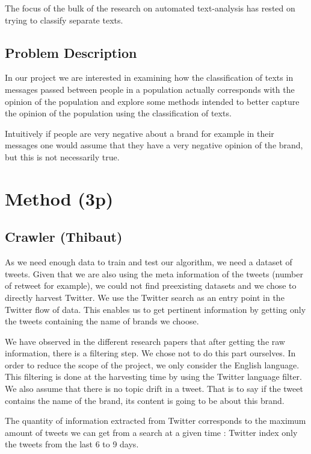 \documentclass[a4paper,11pt]{report}
\begin{document}
The focus of the bulk of the research on automated text-analysis has rested on trying to classify separate texts.

\section{Problem Description}
In our project we are interested in examining how the classification of texts in messages passed between people in a population actually corresponds with the opinion of the population and explore some methods intended to better capture the opinion of the population using the classification of texts. 

Intuitively if people are very negative about a brand for example in their messages one would assume that they have a very negative opinion of the brand, but this is not necessarily true. 

\chapter{Method (3p)}

\section{Crawler (Thibaut)}

As we need enough data to train and test our algorithm, we need a dataset of tweets. Given that we are also using the meta information of the tweets (number of retweet for example), we could not find preexisting datasets and we chose to directly harvest Twitter.
We use the Twitter search as an entry point in the Twitter flow of data. This enables us to get pertinent information by getting only the tweets containing the name of brands we choose.

We have observed in the different research papers that after getting the raw information, there is a filtering step. We chose not to do this part ourselves. In order to reduce the scope of the project, we only consider the English language. This filtering is done at the harvesting time by using the Twitter language filter.
We also assume that there is no topic drift in a tweet. That is to say if the tweet contains the name of the brand, its content is going to be about this brand.

The quantity of information extracted from Twitter corresponds to the maximum amount of tweets we can get from a search at a given time : Twitter index only the tweets from the last 6 to 9 days.
\end{document}
